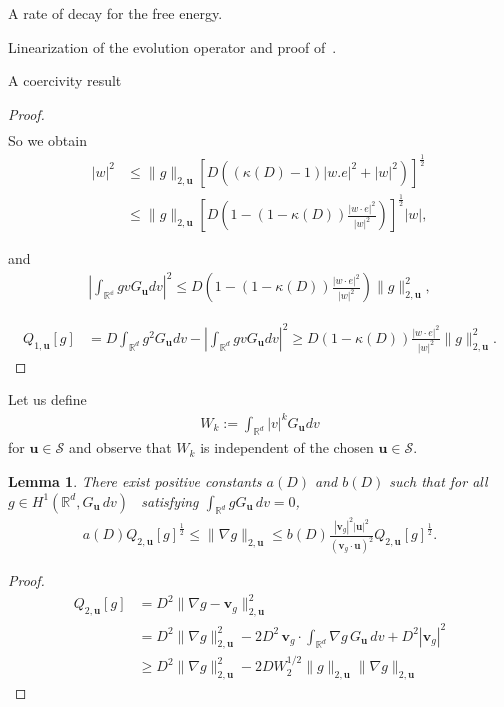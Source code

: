 \documentclass[reqno]{amsart} %
\newtheorem{lemma}{Lemma}[section]
\begin{document}
\begin{section}{A rate of decay for the free energy.}
\begin{section}{Linearization of the evolution operator and proof of~\texorpdfstring{}{thm3}.}
\begin{subsection}{A coercivity result}
\begin{proof}
\begin{align*}
\end{align*}
So we obtain
\begin{align*}
   |w|^2 &\leq \lVert g \rVert_{2,\mathbf{u}}\left[ D\left( (\kappa(D)-1)|w.e|^2+ |w|^2\right)\right]^{\frac{1}{2}}\\
    & \leq  \lVert g \rVert_{2,\mathbf{u}}\left[ D\left(1- (1-\kappa(D))\frac{|w\cdot e|^2}{|w|^2}\right)\right]^{\frac{1}{2}} |w|,
\end{align*}

and
\begin{align*}
    \left|\int_{\mathbb{R^d}}{gvG_{\mathbf{u}}dv}\right|^2 \leq D\left(1- (1-\kappa(D))\frac{|w\cdot e|^2}{|w|^2}\right)\lVert g \rVert_{2,\mathbf{u}}^2,
\end{align*}

\begin{align*}
    Q_{1,\mathbf{u}}[g]&= D \int_{\mathbb{R}^d}g^2G_{\mathbf{u}}dv- \left| \int_{\mathbb{R}^d}gvG_{\mathbf{u}}dv \right|^2 \geq D(1- \kappa(D))\frac{|w\cdot e|^2}{|w|^2} \lVert g \rVert_{2,\mathbf{u}}^2.
\end{align*}
\end{proof}
Let us define 
\begin{align}
\label{Wk}
    W_k:= \int_{\mathbb{R}^d}|v|^kG_\mathbf{u}dv
\end{align}
 for $\mathbf{u} \in \mathcal{S}$ and observe that $W_k$ is independent of the chosen $\mathbf{u} \in \mathcal{S}$.

\begin{lemma}
\label{normequiH1}
    There exist positive constants $a(D)$ and $b(D)$ such that for all ~$g\in H^1(\mathbb{R}^d, G_{\mathbf{u}} \,dv)$ ~{satisfying $\int_{\mathbb{R}^d }g G_{\mathbf{u}} \, dv =0$,}
    \begin{align*}
        a(D)Q_{2,\mathbf{u}}[g]^{\frac{1}{2}}\leq \lVert\nabla g \rVert_{2,\mathbf{u}} \leq   b(D) \frac{|\mathbf{v}_g|^2|\mathbf{u}|^2}{(\mathbf{v}_g \cdot \mathbf{u})^2}Q_{2,\mathbf{u}}[g]^{\frac{1}{2}}.
    \end{align*}
\end{lemma}

\begin{proof}
  \begin{equation}
\label{ptiteq}
\begin{aligned}
Q_{2,\mathbf{u}}[g] &= D^2 \lVert \nabla g -\mathbf{v}_g\rVert_{2,\mathbf{u}}^2\\
&= D^2 \lVert \nabla g \rVert_{2,\mathbf{u}}^2 - 2D^2\, \mathbf{v}_g \cdot \int_{\mathbb{R}^d} \nabla g\, G_\mathbf{u}\,dv + D^2 |\mathbf{v}_g|^2 \\
&\geq D^2 \lVert \nabla g \rVert_{2,\mathbf{u}}^2- 2DW_2^{1/2} \lVert g \rVert_{2,\mathbf{u}} \lVert \nabla g \rVert_{2,\mathbf{u}}
\end{aligned}
\end{equation}


\end{proof}
\end{subsection}
\end{section}
\end{section}
\end{document}
